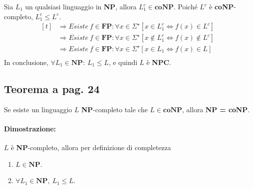 \begin{itemize}
{        Sia $L_{1}$ un qualsiasi linguaggio in \textbf{NP}, allora $L^{c}_{1} \in \textbf{coNP}$.
        Poiché $L^{c}$ è \textbf{coNP}-completo, $L_{1}^{c} \leq L^{c}$.
        \[
            \begin{aligned}[t]
                &\Rightarrow Esiste\ f \in \textbf{FP}: \forall x \in \Sigma^{\star} [x \in L^{c}_{1} \Leftrightarrow f(x) \in L^{c}]\\
                &\Rightarrow Esiste\ f \in \textbf{FP}: \forall x \in \Sigma^{\star} [x \notin L^{c}_{1} \Leftrightarrow f(x) \notin L^{c}]\\
                &\Rightarrow Esiste\ f \in \textbf{FP}: \forall x \in \Sigma^{\star} [x \in L_{1} \Leftrightarrow f(x) \in L]\\
            \end{aligned}
        \]
        In conclusione, $\forall L_{1} \in \textbf{NP}:\ L_{1} \leq L$, e quindi $L$ è \textbf{NPC}.
    }
\end{itemize}

\newpage
\subsection{Teorema a pag. 24}

Se esiste un linguaggio $L$ \textbf{NP}-completo tale che $L \in \textbf{coNP}$, allora \textbf{NP = coNP}.

\paragraph*{Dimostrazione: }

$L$ è \textbf{NP}-completo, allora per definizione di completezza
\begin{enumerate}
    \item $L \in \textbf{NP}$.
    \item $\forall L_{1} \in \textbf{NP},\ L_{1} \leq L$.
\end{enumerate}

